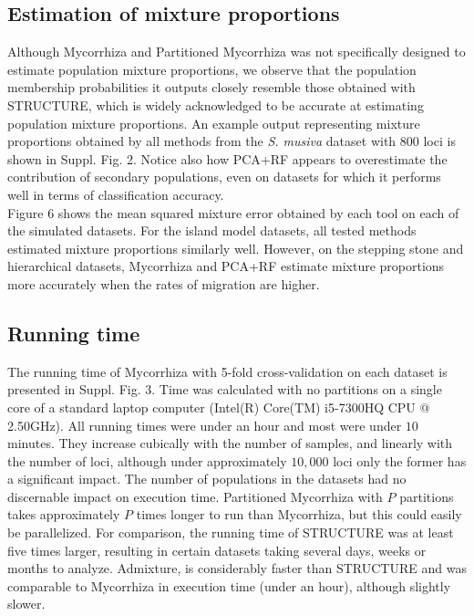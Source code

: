 \documentclass[final]{bioinfo}
\begin{document}
\subsection{Estimation of mixture proportions}
Although Mycorrhiza and Partitioned Mycorrhiza was not specifically designed to estimate population mixture proportions, we observe that the population membership probabilities it outputs closely resemble those obtained with STRUCTURE, which is widely acknowledged to be accurate at estimating population mixture proportions. An example output representing mixture proportions obtained by all methods from the \textit{S. musiva} dataset with $800$ loci is shown in Suppl. Fig. 2. Notice also how PCA+RF appears to overestimate the contribution of secondary populations, even on datasets for which it performs well in terms of classification accuracy.\\
Figure 6 shows the mean squared mixture error obtained by each tool on each of the simulated datasets. For the island model datasets, all tested methods estimated mixture proportions similarly well. However, on the stepping stone and hierarchical datasets, Mycorrhiza and PCA+RF estimate mixture proportions more accurately when the rates of migration are higher.

\subsection{Running time}
The running time of Mycorrhiza with 5-fold cross-validation on each dataset is presented in Suppl. Fig. 3. Time was calculated with no partitions on a single core of a standard laptop computer (Intel(R) Core(TM) i5-7300HQ CPU @ 2.50GHz). All running times were under an hour and most were under $10$ minutes. They increase cubically with the number of samples, and linearly with the number of loci, although under approximately $10,000$ loci only the former has a significant impact. The number of populations in the datasets had no discernable impact on execution time. Partitioned Mycorrhiza with $P$ partitions takes approximately $P$ times longer to run than Mycorrhiza, but this could easily be parallelized. For comparison, the running time of STRUCTURE was at least five times larger, resulting in certain datasets taking several days, weeks or months to analyze. Admixture, is considerably faster than STRUCTURE and was comparable to Mycorrhiza in execution time (under an hour), although slightly slower.
\end{document}
